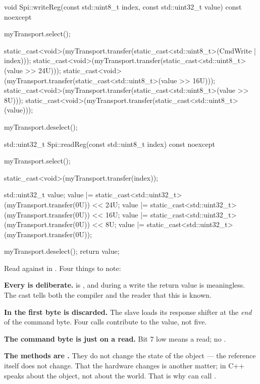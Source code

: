 \begin{cppcode}
void Spi::writeReg(const std::uint8_t index, const std::uint32_t value) const noexcept
{
    myTransport.select();

    static_cast<void>(myTransport.transfer(static_cast<std::uint8_t>(CmdWrite | index)));
    static_cast<void>(myTransport.transfer(static_cast<std::uint8_t>(value >> 24U)));
    static_cast<void>(myTransport.transfer(static_cast<std::uint8_t>(value >> 16U)));
    static_cast<void>(myTransport.transfer(static_cast<std::uint8_t>(value >> 8U)));
    static_cast<void>(myTransport.transfer(static_cast<std::uint8_t>(value)));

    myTransport.deselect();
}

std::uint32_t Spi::readReg(const std::uint8_t index) const noexcept
{
    myTransport.select();

    static_cast<void>(myTransport.transfer(index));

    std::uint32_t value{};
    value |= static_cast<std::uint32_t>(myTransport.transfer(0U)) << 24U;
    value |= static_cast<std::uint32_t>(myTransport.transfer(0U)) << 16U;
    value |= static_cast<std::uint32_t>(myTransport.transfer(0U)) << 8U;
    value |= static_cast<std::uint32_t>(myTransport.transfer(0U));

    myTransport.deselect();
    return value;
}
\end{cppcode}

Read  against  in . Four things to note:

\textbf{Every  is deliberate.}  is \code{[[nodiscard]]},
and during a write the return value is meaningless. The cast tells both the compiler and the
reader that this is known.

\textbf{In  the first byte is discarded.} The slave loads its response shifter at
the \emph{end} of the command byte. Four  calls contribute to the value, not five.

\textbf{The command byte is just  on a read.} Bit 7 low means a read; no
.

\textbf{The methods are .} They do not change the state of the  object ---
the reference itself does not change. That the hardware changes is another matter;  in
C++ speaks about the object, not about the world. That is why  can call
.

